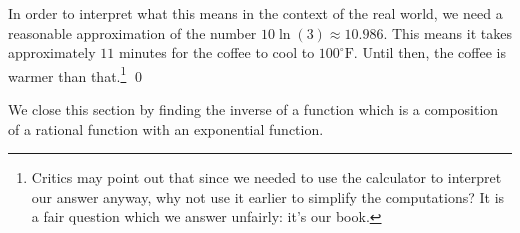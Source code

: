\begin{ex}
\begin{center}
\begin{tabular}{m{0.5in}m{2.5in}m{2.5in}}
\end{tabular}

\end{center}

In order to interpret what this means in the context of the real world, we need a reasonable approximation of the number $10 \ln(3) \approx 10.986$.  This means it takes approximately $11$ minutes for the coffee to cool to $100^{\circ}\mbox{F}$.  Until then, the coffee is warmer than that.\footnote{Critics may point out that since we needed to use the calculator to interpret our answer anyway, why not use it earlier to simplify the computations? It is a fair question which we answer unfairly:  it's our book.} \qed
\end{ex}

We close this section by finding the inverse of a function which is a composition of a rational function with an exponential function.

